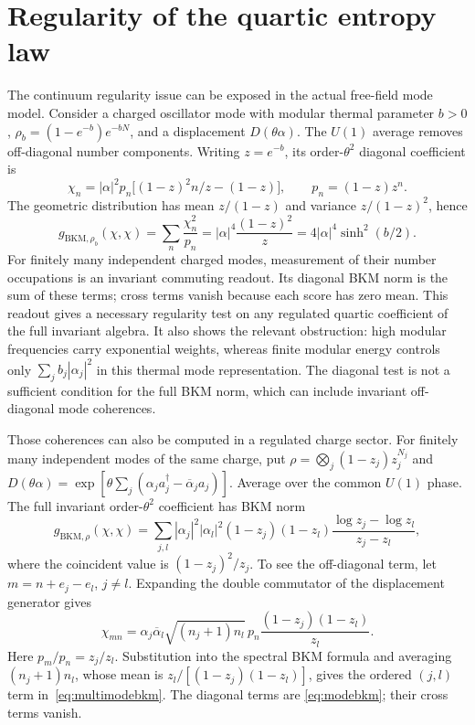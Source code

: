 \section{Regularity of the quartic entropy law}\label{app:bkm}

The continuum regularity issue can be exposed in the actual free-field mode model.
Consider a charged oscillator mode with modular thermal parameter \(b>0\),
\(\rho_b=(1-e^{-b})e^{-bN}\), and a displacement \(D(\theta\alpha)\).
The \(U(1)\) average removes off-diagonal number components.
Writing \(z=e^{-b}\), its order-\(\theta^2\) diagonal coefficient is
\[
\chi_n=|\alpha|^2p_n\bigl[(1-z)^2n/z-(1-z)\bigr],
\qquad p_n=(1-z)z^n .
\]
The geometric distribution has mean \(z/(1-z)\) and variance \(z/(1-z)^2\), hence
\begin{equation}\label{eq:modebkm}
g_{\mathrm{BKM},\rho_b}(\chi,\chi)
=\sum_n\frac{\chi_n^2}{p_n}
=|\alpha|^4\frac{(1-z)^2}{z}
=4|\alpha|^4\sinh^2(b/2).
\end{equation}
For finitely many independent charged modes, measurement of their number occupations
is an invariant commuting readout. Its diagonal BKM norm is the sum of these terms;
cross terms vanish because each score has zero mean. This readout gives a necessary
regularity test on any regulated quartic coefficient of the full invariant algebra.
It also shows the relevant obstruction: high modular frequencies carry exponential
weights, whereas finite modular energy controls only \(\sum_j b_j|\alpha_j|^2\)
in this thermal mode representation.
The diagonal test is not a sufficient condition for the full BKM norm, which can include
invariant off-diagonal mode coherences.

Those coherences can also be computed in a regulated charge sector. For finitely many
independent modes of the same charge, put
\(\rho=\bigotimes_j(1-z_j)z_j^{N_j}\) and
\(D(\theta\alpha)=\exp[\theta\sum_j(\alpha_ja_j^\dagger-\overline\alpha_ja_j)]\).
Average over the common \(U(1)\) phase. The full invariant order-\(\theta^2\)
coefficient has BKM norm
\begin{equation}\label{eq:multimodebkm}
g_{\mathrm{BKM},\rho}(\chi,\chi)
=\sum_{j,l}|\alpha_j|^2|\alpha_l|^2
 (1-z_j)(1-z_l)\frac{\log z_j-\log z_l}{z_j-z_l},
\end{equation}
where the coincident value is \((1-z_j)^2/z_j\).
To see the off-diagonal term, let \(m=n+e_j-e_l\), \(j\ne l\).
Expanding the double commutator of the displacement generator gives
\[
\chi_{mn}=\alpha_j\overline\alpha_l
 \sqrt{(n_j+1)n_l}\,p_n\frac{(1-z_j)(1-z_l)}{z_l}.
\]
Here \(p_m/p_n=z_j/z_l\). Substitution into the spectral BKM formula and averaging
\((n_j+1)n_l\), whose mean is \(z_l/[(1-z_j)(1-z_l)]\), gives the
ordered \((j,l)\) term in~\eqref{eq:multimodebkm}. The diagonal terms are
\eqref{eq:modebkm}; their cross terms vanish.

